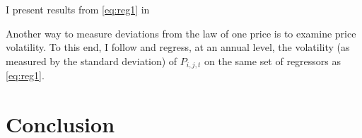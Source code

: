 \documentclass[12pt,twoside]{article}
\begin{document}
I present results from \eqref{eq:reg1} in %

Another way to measure deviations from the law of one price is to examine price volatility.
To this end, I follow \cite{engelrogers} and regress, at an annual level, the volatility (as measured by the standard deviation) of $P_{i,j,t}$ on the same set of regressors as \eqref{eq:reg1}.

\section{Conclusion}

\newpage
	

 
\end{document}
